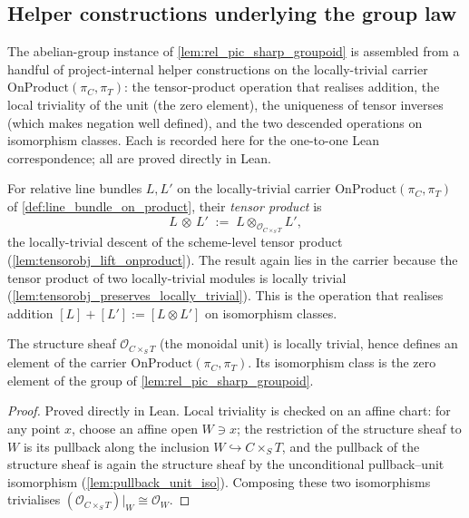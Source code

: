 \subsection{Helper constructions underlying the group law}
\label{subsec:relpic_group_helpers}

The abelian-group instance of \cref{lem:rel_pic_sharp_groupoid} is assembled
from a handful of project-internal helper constructions on the locally-trivial
carrier \(\mathrm{OnProduct}(\pi_C, \pi_T)\): the tensor-product operation that
realises addition, the local triviality of the unit (the zero element), the
uniqueness of tensor inverses (which makes negation well defined), and the two
descended operations on isomorphism classes. Each is recorded here for the
one-to-one Lean correspondence; all are proved directly in Lean.

\begin{definition}
  \label{def:rel_tensor_obj}
  For relative line bundles \(L, L'\) on the locally-trivial carrier
  \(\mathrm{OnProduct}(\pi_C, \pi_T)\) of \cref{def:line_bundle_on_product},
  their \emph{tensor product} is
  \[
    L \,\mathbin{\otimes}\, L' \;:=\;
      L \otimes_{\mathcal{O}_{C \times_S T}} L',
  \]
  the locally-trivial descent of the scheme-level tensor product
  (\cref{lem:tensorobj_lift_onproduct}). The result again lies in the carrier
  because the tensor product of two locally-trivial modules is locally trivial
  (\cref{lem:tensorobj_preserves_locally_trivial}). This is the operation that
  realises addition \([L] + [L'] := [L \otimes L']\) on isomorphism classes.
\end{definition}

\begin{lemma}
  \label{lem:rel_pic_sharp_unit_loctriv}
  The structure sheaf \(\mathcal{O}_{C \times_S T}\) (the monoidal unit) is
  locally trivial, hence defines an element of the carrier
  \(\mathrm{OnProduct}(\pi_C, \pi_T)\). Its isomorphism class is the zero
  element of the group of \cref{lem:rel_pic_sharp_groupoid}.
\end{lemma}

\begin{proof}
  \leanok
  Proved directly in Lean. Local triviality is checked on an affine chart: for
  any point \(x\), choose an affine open \(W \ni x\); the restriction of the
  structure sheaf to \(W\) is its pullback along the inclusion
  \(W \hookrightarrow C \times_S T\), and the pullback of the structure sheaf is
  again the structure sheaf by the unconditional pullback--unit isomorphism
  (\cref{lem:pullback_unit_iso}). Composing these two isomorphisms trivialises
  \((\mathcal{O}_{C \times_S T})|_W \cong \mathcal{O}_W\).
\end{proof}

